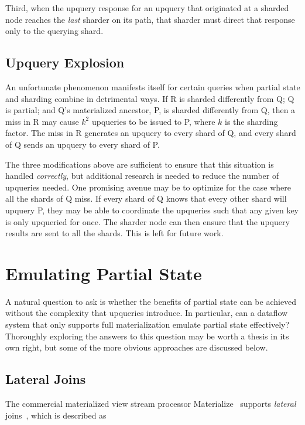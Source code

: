 Third, when the upquery response for an upquery that originated at a sharded
node reaches the \emph{last} sharder on its path, that sharder must direct that
response only to the querying shard.

\subsection{Upquery Explosion}

An unfortunate phenomenon manifests itself for certain queries when partial
state and sharding combine in detrimental ways. If R is sharded differently from
Q; Q is partial; and Q's materialized ancestor, P, is sharded differently from
Q, then a miss in R may cause $k^2$ upqueries to be issued to P, where $k$ is
the sharding factor. The miss in R generates an upquery to every shard of Q, and
every shard of Q sends an upquery to every shard of P.

The three modifications above are sufficient to ensure that this situation is
handled \emph{correctly}, but additional research is needed to reduce the number
of upqueries needed. One promising avenue may be to optimize for the case where
all the shards of Q miss. If every shard of Q knows that every other shard will
upquery P, they may be able to coordinate the upqueries such that any given key
is only upqueried for once. The sharder node can then ensure that the upquery
results are sent to all the shards. This is left for future work.

\section{Emulating Partial State}

A natural question to ask is whether the benefits of partial state can be
achieved without the complexity that upqueries introduce. In particular, can a
dataflow system that only supports full materialization emulate partial state
effectively? Thoroughly exploring the answers to this question may be worth a
thesis in its own right, but some of the more obvious approaches are discussed
below.

\subsection{Lateral Joins}

The commercial materialized view stream processor Materialize~\cite{materialize}
supports \emph{lateral} joins~\cite{lateral-join}, which is described as

